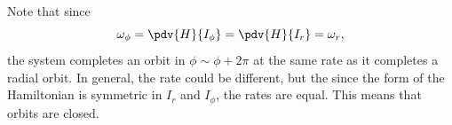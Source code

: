\begin{example}
    Note that since
    \begin{equation}
        \omega_{\phi} = \pdv{H}{I_{\phi}} = \pdv{H}{I_r} = \omega_r,
    \end{equation}
    the system completes an orbit in \(\phi \sim \phi + 2\pi\) at the same rate as it completes a radial orbit. In general, the rate could be different, but the since the form of the Hamiltonian is symmetric in \(I_r\) and \(I_{\phi}\), the rates are equal. This means that orbits are closed.
\end{example}
